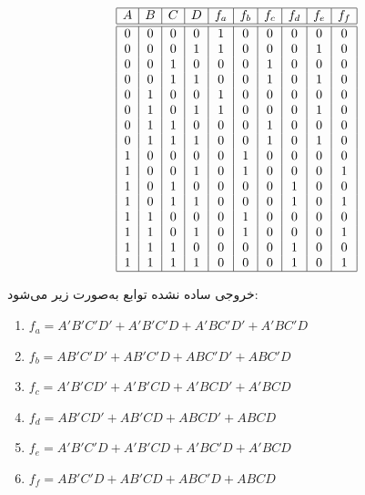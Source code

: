 \begin{latin}
	\centering
	\[
	\begin{array}{|c|c|c|c|c|c|c|c|c|c|}
		\hline
		A & B & C & D & f_a & f_b & f_c & f_d & f_e & f_f \\
		\hline\hline
		0 & 0 & 0 & 0 & 1 & 0 & 0 & 0 & 0 & 0 \\
		0 & 0 & 0 & 1 & 1 & 0 & 0 & 0 & 1 & 0 \\
		0 & 0 & 1 & 0 & 0 & 0 & 1 & 0 & 0 & 0 \\
		0 & 0 & 1 & 1 & 0 & 0 & 1 & 0 & 1 & 0 \\
		0 & 1 & 0 & 0 & 1 & 0 & 0 & 0 & 0 & 0 \\
		0 & 1 & 0 & 1 & 1 & 0 & 0 & 0 & 1 & 0 \\
		0 & 1 & 1 & 0 & 0 & 0 & 1 & 0 & 0 & 0 \\
		0 & 1 & 1 & 1 & 0 & 0 & 1 & 0 & 1 & 0 \\
		1 & 0 & 0 & 0 & 0 & 1 & 0 & 0 & 0 & 0 \\ 
		1 & 0 & 0 & 1 & 0 & 1 & 0 & 0 & 0 & 1 \\
		1 & 0 & 1 & 0 & 0 & 0 & 0 & 1 & 0 & 0 \\
		1 & 0 & 1 & 1 & 0 & 0 & 0 & 1 & 0 & 1 \\
		1 & 1 & 0 & 0 & 0 & 1 & 0 & 0 & 0 & 0 \\
		1 & 1 & 0 & 1 & 0 & 1 & 0 & 0 & 0 & 1 \\
		1 & 1 & 1 & 0 & 0 & 0 & 0 & 1 & 0 & 0 \\
		1 & 1 & 1 & 1 & 0 & 0 & 0 & 1 & 0 & 1 \\
		\hline
	\end{array}
	\]
\end{latin}


خروجی ساده نشده توابع به‌صورت زیر می‌شود:

\begin{latin}
	\begin{enumerate}
		\item 
		$f_a=A'B'C'D' + A'B'C'D + A'BC'D' + A'BC'D$
		
		\item 
		$f_b=AB'C'D' + AB'C'D + ABC'D' + ABC'D$
		
		\item 
		$f_c=A'B'CD' + A'B'CD + A'BCD' + A'BCD$
		
		\item 
		 $f_d=AB'CD' + AB'CD + ABCD' + ABCD$
		 
		 \item 
		 $f_e=A'B'C'D + A'B'CD + A'BC'D + A'BCD$
		 
		 \item 
		 $f_f=AB'C'D + AB'CD + ABC'D + ABCD$
	\end{enumerate}
\end{latin}


